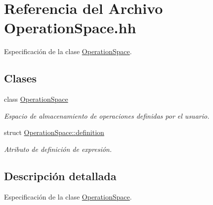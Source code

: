 \hypertarget{_operation_space_8hh}{}\section{Referencia del Archivo Operation\+Space.\+hh}
\label{_operation_space_8hh}


Especificación de la clase \hyperlink{class_operation_space}{Operation\+Space}.  


\subsection*{Clases}
\begin{DoxyCompactItemize}
\item 
class \hyperlink{class_operation_space}{Operation\+Space}
\begin{DoxyCompactList}\small\item\em Espacio de almacenamiento de operaciones definidas por el usuario. \end{DoxyCompactList}\item 
struct \hyperlink{struct_operation_space_1_1definition}{Operation\+Space\+::definition}
\begin{DoxyCompactList}\small\item\em Atributo de definición de expresión. \end{DoxyCompactList}\end{DoxyCompactItemize}


\subsection{Descripción detallada}
Especificación de la clase \hyperlink{class_operation_space}{Operation\+Space}. 

